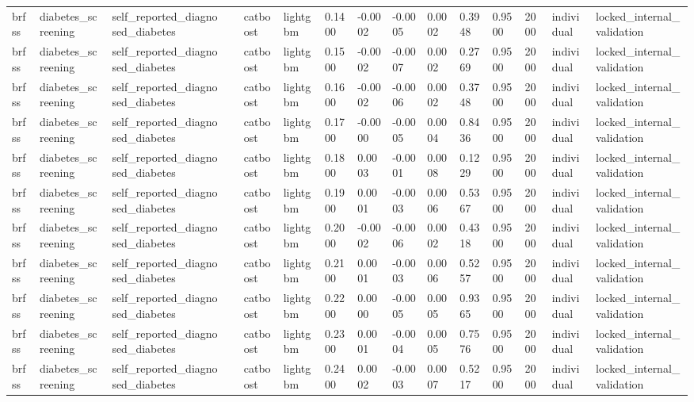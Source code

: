 \begin{tabular}{lllllllllllllll}
brfss & diabetes\_screening & self\_reported\_diagnosed\_diabetes &  & catboost & lightgbm & 0.1400 & -0.0002 & -0.0005 & 0.0002 & 0.3948 & 0.9500 & 2000 & individual & locked\_internal\_validation \\
brfss & diabetes\_screening & self\_reported\_diagnosed\_diabetes &  & catboost & lightgbm & 0.1500 & -0.0002 & -0.0007 & 0.0002 & 0.2769 & 0.9500 & 2000 & individual & locked\_internal\_validation \\
brfss & diabetes\_screening & self\_reported\_diagnosed\_diabetes &  & catboost & lightgbm & 0.1600 & -0.0002 & -0.0006 & 0.0002 & 0.3748 & 0.9500 & 2000 & individual & locked\_internal\_validation \\
brfss & diabetes\_screening & self\_reported\_diagnosed\_diabetes &  & catboost & lightgbm & 0.1700 & -0.0000 & -0.0005 & 0.0004 & 0.8436 & 0.9500 & 2000 & individual & locked\_internal\_validation \\
brfss & diabetes\_screening & self\_reported\_diagnosed\_diabetes &  & catboost & lightgbm & 0.1800 & 0.0003 & -0.0001 & 0.0008 & 0.1229 & 0.9500 & 2000 & individual & locked\_internal\_validation \\
brfss & diabetes\_screening & self\_reported\_diagnosed\_diabetes &  & catboost & lightgbm & 0.1900 & 0.0001 & -0.0003 & 0.0006 & 0.5367 & 0.9500 & 2000 & individual & locked\_internal\_validation \\
brfss & diabetes\_screening & self\_reported\_diagnosed\_diabetes &  & catboost & lightgbm & 0.2000 & -0.0002 & -0.0006 & 0.0002 & 0.4318 & 0.9500 & 2000 & individual & locked\_internal\_validation \\
brfss & diabetes\_screening & self\_reported\_diagnosed\_diabetes &  & catboost & lightgbm & 0.2100 & 0.0001 & -0.0003 & 0.0006 & 0.5257 & 0.9500 & 2000 & individual & locked\_internal\_validation \\
brfss & diabetes\_screening & self\_reported\_diagnosed\_diabetes &  & catboost & lightgbm & 0.2200 & 0.0000 & -0.0005 & 0.0005 & 0.9365 & 0.9500 & 2000 & individual & locked\_internal\_validation \\
brfss & diabetes\_screening & self\_reported\_diagnosed\_diabetes &  & catboost & lightgbm & 0.2300 & 0.0001 & -0.0004 & 0.0005 & 0.7576 & 0.9500 & 2000 & individual & locked\_internal\_validation \\
brfss & diabetes\_screening & self\_reported\_diagnosed\_diabetes &  & catboost & lightgbm & 0.2400 & 0.0002 & -0.0003 & 0.0007 & 0.5217 & 0.9500 & 2000 & individual & locked\_internal\_validation \\

\end{tabular}
